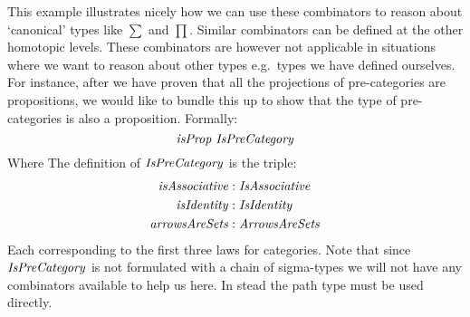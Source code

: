 This example illustrates nicely how we can use these combinators to
reason about `canonical' types like $\sum$ and $\prod$. Similar
combinators can be defined at the other homotopic levels. These
combinators are however not applicable in situations where we want to
reason about other types e.g.\ types we have defined ourselves. For
instance, after we have proven that all the projections of
pre-categories are propositions, we would like to bundle this up to
show that the type of pre-categories is also a proposition. Formally:
%
\begin{equation}
\label{eq:propIsPreCategory}
\isProp\ \IsPreCategory
\end{equation}
%
Where The definition of $\IsPreCategory$ is the triple:
%
\begin{align*}
\var{isAssociative} & \tp \var{IsAssociative}\\
\isIdentity    & \tp \var{IsIdentity}\\
\var{arrowsAreSets} & \tp \var{ArrowsAreSets}
\end{align*}
%
Each corresponding to the first three laws for categories. Note that
since $\IsPreCategory$ is not formulated with a chain of sigma-types
we will not have any combinators available to help us here. In stead
the path type must be used directly.

